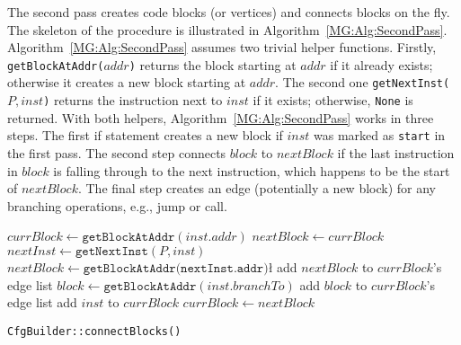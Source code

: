 The second pass creates code blocks (or vertices) and connects blocks on the fly.
The skeleton of the procedure is illustrated in Algorithm~\ref{MG:Alg:SecondPass}.
Algorithm~\ref{MG:Alg:SecondPass} assumes two trivial helper functions.
Firstly, \texttt{getBlockAtAddr($addr$)} returns the block starting at $addr$
if it already exists; otherwise it creates a new block starting at $addr$.
The second one \texttt{getNextInst($P, inst$)} returns the instruction next to $inst$ if it exists; otherwise, \texttt{None} is returned.
With both helpers, Algorithm~\ref{MG:Alg:SecondPass} works in three steps.
The first if statement creates a new block if $inst$ was marked as \texttt{start} in the first pass.
The second step connects $block$ to $nextBlock$ if the last instruction in $block$ is falling through to the next instruction, which happens to be the start of $nextBlock$.
The final step creates an edge (potentially a new block) for any branching operations, e.g., jump or call.


\begin{algorithm}[t]
    \DontPrintSemicolon
     {
         {
            $currBlock \gets \texttt{getBlockAtAddr}(inst.addr)$\;
        }
        $nextBlock \gets currBlock$\;
        $nextInst \gets \texttt{getNextInst}(P, inst)$\;
         {
             {
                $nextBlock \gets \texttt{getBlockAtAddr(nextInst.addr)}$\l\;
                add $nextBlock$ to $currBlock$'s edge list\;
            }
        }
         {
            $block \gets \texttt{getBlockAtAddr}(inst.branchTo)$\;
            add $block$ to $currBlock$'s edge list\;
        }
        add $inst$ to $currBlock$\;
        $currBlock \gets nextBlock$\;
    }
    \caption{\texttt{CfgBuilder::connectBlocks()}}
    \label{MG:Alg:SecondPass}
\end{algorithm}

